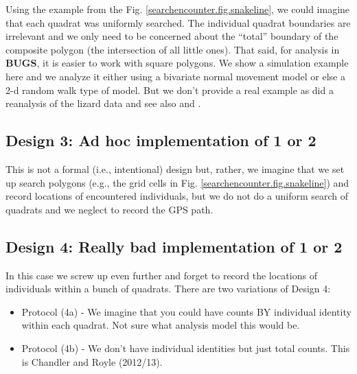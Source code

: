 Using the example from the Fig. \ref{searchencounter.fig.snakeline}, we could imagine that each
quadrat was uniformly searched. The individual quadrat boundaries are
irrelevant and we only need to be concerned about the ``total''
boundary of the composite polygon (the intersection of all little
ones). That said, for analysis in {\bf BUGS}, it is easier to work with square
polygons.  We show a simulation example here and we analyze it either
using a bivariate normal movement model or else a 2-d random walk type
of model.  But we don't provide a real example as \citet{royle_dorazio:2008}
did a reanalysis of the lizard data and see also
\citet{efford:2011ecol} and \citet{marques_etal:2011}.


\subsection{ Design 3: Ad hoc implementation of 1 or 2}

This is not a formal (i.e., intentional) design but, rather, we
imagine that we set up
search polygons (e.g., the grid cells in Fig. \ref{searchencounter.fig.snakeline}) and
record
locations of encountered individuals, but we do not do a uniform search
of quadrats and we neglect to record the GPS path.

\subsection{Design 4: Really bad implementation of 1 or 2}

In this
case we screw up even further and forget to record the locations of
individuals within a bunch of quadrats.
There are two variations of Design 4:
\begin{itemize}
\item[] Protocol (4a) - We imagine that you could have
counts BY individual identity within each quadrat. Not sure what
analysis model this would be.
\item[] Protocol (4b) - We don't have
individual identities but just total counts. This is Chandler and
Royle (2012/13).
\end{itemize}


